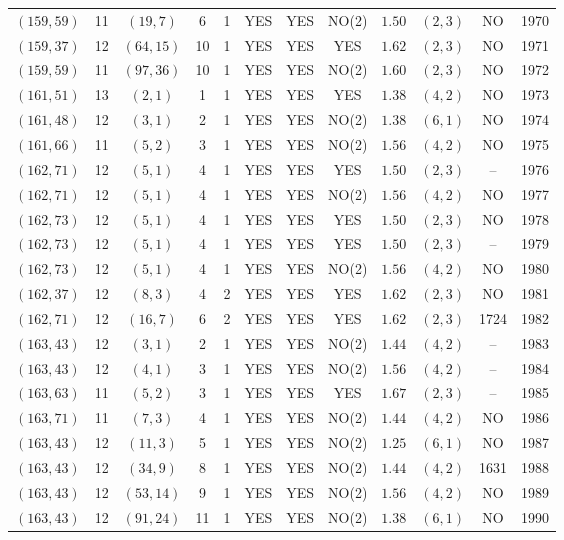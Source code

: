 \begin{longtable}{|c|c|c|c|c|c|c|c|c|c|c|c|}
$(159,59)$ & 11 & $(19,7)$ & 6 & 1 & YES & YES & NO(2) & $1.50$ & $(2,3)$ & NO & 1970\\
$(159,37)$ & 12 & $(64,15)$ & 10 & 1 & YES & YES & YES & $1.62$ & $(2,3)$ & NO & 1971\\
$(159,59)$ & 11 & $(97,36)$ & 10 & 1 & YES & YES & NO(2) & $1.60$ & $(2,3)$ & NO & 1972\\
$(161,51)$ & 13 & $(2,1)$ & 1 & 1 & YES & YES & YES & $1.38$ & $(4,2)$ & NO & 1973\\
$(161,48)$ & 12 & $(3,1)$ & 2 & 1 & YES & YES & NO(2) & $1.38$ & $(6,1)$ & NO & 1974\\
$(161,66)$ & 11 & $(5,2)$ & 3 & 1 & YES & YES & NO(2) & $1.56$ & $(4,2)$ & NO & 1975\\
$(162,71)$ & 12 & $(5,1)$ & 4 & 1 & YES & YES & YES & $1.50$ & $(2,3)$ & -- & 1976\\
$(162,71)$ & 12 & $(5,1)$ & 4 & 1 & YES & YES & NO(2) & $1.56$ & $(4,2)$ & NO & 1977\\
$(162,73)$ & 12 & $(5,1)$ & 4 & 1 & YES & YES & YES & $1.50$ & $(2,3)$ & NO & 1978\\
$(162,73)$ & 12 & $(5,1)$ & 4 & 1 & YES & YES & YES & $1.50$ & $(2,3)$ & -- & 1979\\
$(162,73)$ & 12 & $(5,1)$ & 4 & 1 & YES & YES & NO(2) & $1.56$ & $(4,2)$ & NO & 1980\\
$(162,37)$ & 12 & $(8,3)$ & 4 & 2 & YES & YES & YES & $1.62$ & $(2,3)$ & NO & 1981\\
$(162,71)$ & 12 & $(16,7)$ & 6 & 2 & YES & YES & YES & $1.62$ & $(2,3)$ & 1724 & 1982\\
$(163,43)$ & 12 & $(3,1)$ & 2 & 1 & YES & YES & NO(2) & $1.44$ & $(4,2)$ & -- & 1983\\
$(163,43)$ & 12 & $(4,1)$ & 3 & 1 & YES & YES & NO(2) & $1.56$ & $(4,2)$ & -- & 1984\\
$(163,63)$ & 11 & $(5,2)$ & 3 & 1 & YES & YES & YES & $1.67$ & $(2,3)$ & -- & 1985\\
$(163,71)$ & 11 & $(7,3)$ & 4 & 1 & YES & YES & NO(2) & $1.44$ & $(4,2)$ & NO & 1986\\
$(163,43)$ & 12 & $(11,3)$ & 5 & 1 & YES & YES & NO(2) & $1.25$ & $(6,1)$ & NO & 1987\\
$(163,43)$ & 12 & $(34,9)$ & 8 & 1 & YES & YES & NO(2) & $1.44$ & $(4,2)$ & 1631 & 1988\\
$(163,43)$ & 12 & $(53,14)$ & 9 & 1 & YES & YES & NO(2) & $1.56$ & $(4,2)$ & NO & 1989\\
$(163,43)$ & 12 & $(91,24)$ & 11 & 1 & YES & YES & NO(2) & $1.38$ & $(6,1)$ & NO & 1990\\

\end{longtable}
